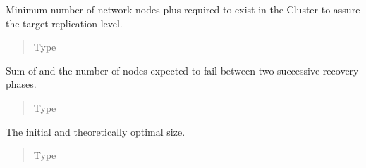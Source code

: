 \documentclass[letterpaper,10pt,english]{sphinxmanual}
\begin{document}
\begin{fulllineitems}
\begin{fulllineitems}
\label{\detokenize{app.domain:app.domain.cluster_groups.Cluster.critical_size}}
Minimum number of network nodes plus required to exist in the
Cluster to assure the target replication level.
\begin{quote}\begin{description}
\item[{Type}] \leavevmode
{}

\end{description}\end{quote}

\end{fulllineitems}


\begin{fulllineitems}
\label{\detokenize{app.domain:app.domain.cluster_groups.Cluster.sufficient_size}}
Sum of {\hyperref[\detokenize{app.domain:app.domain.cluster_groups.Cluster.critical_size}]{}}
and the number of nodes expected to fail between two successive
recovery phases.
\begin{quote}\begin{description}
\item[{Type}] \leavevmode
{}

\end{description}\end{quote}

\end{fulllineitems}


\begin{fulllineitems}
\label{\detokenize{app.domain:app.domain.cluster_groups.Cluster.original_size}}
The initial and theoretically optimal
{\hyperref[\detokenize{app.domain:app.domain.cluster_groups.Cluster}]{}} size.
\begin{quote}\begin{description}
\item[{Type}] \leavevmode
{}


\end{description}
\end{quote}
\end{fulllineitems}
\end{fulllineitems}
\end{document}
